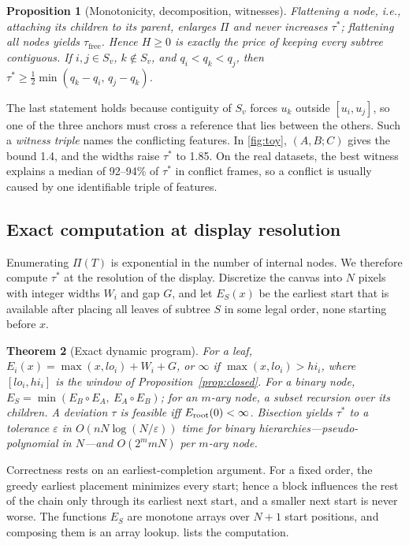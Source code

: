 \documentclass[review]{vgtc}                 %
\newtheorem{theorem}{Theorem}
\newtheorem{proposition}[theorem]{Proposition}
\newcommand{\free}{\mathrm{free}}
\begin{document}
\begin{proposition}[Monotonicity, decomposition, witnesses]\label{prop:mono}
Flattening a node, i.e., attaching its children to its parent, enlarges $\Pi$ and never increases $\tau^*$; flattening all nodes yields $\tau_\free$. Hence $H\ge0$ is exactly the price of keeping every subtree contiguous. If $i,j\in S_v$, $k\notin S_v$, and $q_i<q_k<q_j$, then $\tau^*\ge\frac12\min(q_k-q_i,\,q_j-q_k)$.
\end{proposition}
The last statement holds because contiguity of $S_v$ forces $u_k$ outside $[u_i,u_j]$, so one of the three anchors must cross a reference that lies between the others. Such a \emph{witness triple} names the conflicting features. In \cref{fig:toy}, $(A,B;C)$ gives the bound 1.4, and the widths raise $\tau^*$ to 1.85. On the real datasets, the best witness explains a median of 92--94\% of $\tau^*$ in conflict frames, so a conflict is usually caused by one identifiable triple of features.

\subsection{Exact computation at display resolution}
Enumerating $\Pi(T)$ is exponential in the number of internal nodes. We therefore compute $\tau^*$ at the resolution of the display. Discretize the canvas into $N$ pixels with integer widths $W_i$ and gap $G$, and let $E_S(x)$ be the earliest start that is available after placing all leaves of subtree $S$ in some legal order, none starting before $x$.

\begin{theorem}[Exact dynamic program]\label{thm:dp}
For a leaf, $E_i(x)=\max(x,lo_i)+W_i+G$, or $\infty$ if $\max(x,lo_i)>hi_i$, where $[lo_i,hi_i]$ is the window of Proposition~\ref{prop:closed}. For a binary node, $E_S=\min(E_B\circ E_A,\ E_A\circ E_B)$; for an $m$-ary node, a subset recursion over its children. A deviation $\tau$ is feasible iff $E_{\rm root}(0)<\infty$. Bisection yields $\tau^*$ to a tolerance $\varepsilon$ in $O(nN\log(N/\varepsilon))$ time for binary hierarchies---pseudo-polynomial in $N$---and $O(2^m mN)$ per $m$-ary node.
\end{theorem}
Correctness rests on an earliest-completion argument. For a fixed order, the greedy earliest placement minimizes every start; hence a block influences the rest of the chain only through its earliest next start, and a smaller next start is never worse. The functions $E_S$ are monotone arrays over $N+1$ start positions, and composing them is an array lookup.  lists the computation.
\end{document}
